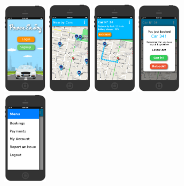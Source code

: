 \documentclass[11pt]{article} %
\begin{document}
\begin{figure}[H]
	\includegraphics[width=0.2\textwidth]{mockup/1Login.png}
	\includegraphics[width=0.2\textwidth]{mockup/2MainClient.png}
	\includegraphics[width=0.2\textwidth]{mockup/3CarSelected.png}
	\includegraphics[width=0.2\textwidth]{mockup/4CarBooked.png}
	\includegraphics[width=0.2\textwidth]{mockup/11Menu.png}

\end{figure}
\end{document}
